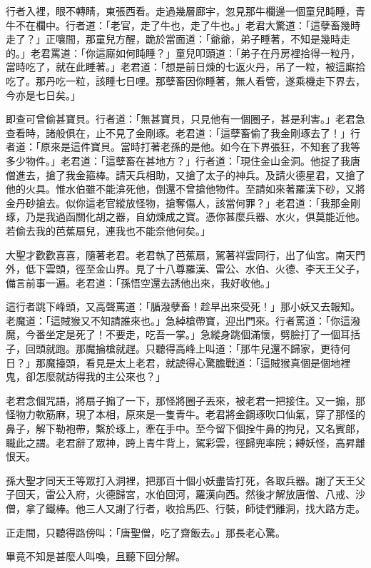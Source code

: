 行者入裡，眼不轉睛，東張西看。走過幾層廊宇，忽見那牛欄邊一個童兒盹睡，青牛不在欄中。行者道：「老官，走了牛也，走了牛也。」老君大驚道：「這孽畜幾時走了？」正嚷間，那童兒方醒，跪於當面道：「爺爺，弟子睡著，不知是幾時走的。」老君罵道：「你這廝如何盹睡？」童兒叩頭道：「弟子在丹房裡拾得一粒丹，當時吃了，就在此睡著。」老君道：「想是前日煉的七返火丹，吊了一粒，被這廝拾吃了。那丹吃一粒，該睡七日哩。那孽畜因你睡著，無人看管，遂乘機走下界去，今亦是七日矣。」

即查可曾偷甚寶貝。行者道：「無甚寶貝，只見他有一個圈子，甚是利害。」老君急查看時，諸般俱在，止不見了金剛琢。老君道：「這孽畜偷了我金剛琢去了！」行者道：「原來是這件寶貝。當時打著老孫的是他。如今在下界張狂，不知套了我等多少物件。」老君道：「這孽畜在甚地方？」行者道：「現住金山金洞。他捉了我唐僧進去，搶了我金箍棒。請天兵相助，又搶了太子的神兵。及請火德星君，又搶了他的火具。惟水伯雖不能渰死他，倒還不曾搶他物件。至請如來著羅漢下砂，又將金丹砂搶去。似你這老官縱放怪物，搶奪傷人，該當何罪？」老君道：「我那金剛琢，乃是我過函關化胡之器，自幼煉成之寶。憑你甚麼兵器、水火，俱莫能近他。若偷去我的芭蕉扇兒，連我也不能奈他何矣。」

大聖才歡歡喜喜，隨著老君。老君執了芭蕉扇，駕著祥雲同行，出了仙宮。南天門外，低下雲頭，徑至金山界。見了十八尊羅漢、雷公、水伯、火德、李天王父子，備言前事一遍。老君道：「孫悟空還去誘他出來，我好收他。」

這行者跳下峰頭，又高聲罵道：「腯潑孽畜！趁早出來受死！」那小妖又去報知。老魔道：「這賊猴又不知請誰來也。」急綽槍帶寶，迎出門來。行者罵道：「你這潑魔，今番坐定是死了！不要走，吃吾一掌。」急縱身跳個滿懷，劈臉打了一個耳括子，回頭就跑。那魔掄槍就趕。只聽得高峰上叫道：「那牛兒還不歸家，更待何日？」那魔擡頭，看見是太上老君，就諕得心驚膽戰道：「這賊猴真個是個地裡鬼，卻怎麼就訪得我的主公來也？」

老君念個咒語，將扇子搧了一下，那怪將圈子丟來，被老君一把接住。又一搧，那怪物力軟筋麻，現了本相，原來是一隻青牛。老君將金鋼琢吹口仙氣，穿了那怪的鼻子，解下勒袍帶，繫於琢上，牽在手中。至今留下個拴牛鼻的拘兒，又名賓郎，職此之謂。老君辭了眾神，跨上青牛背上，駕彩雲，徑歸兜率院；縛妖怪，高昇離恨天。

孫大聖才同天王等眾打入洞裡，把那百十個小妖盡皆打死，各取兵器。謝了天王父子回天，雷公入府，火德歸宮，水伯回河，羅漢向西。然後才解放唐僧、八戒、沙僧，拿了鐵棒。他三人又謝了行者，收拾馬匹、行裝，師徒們離洞，找大路方走。

正走間，只聽得路傍叫：「唐聖僧，吃了齋飯去。」那長老心驚。

畢竟不知是甚麼人叫喚，且聽下回分解。
